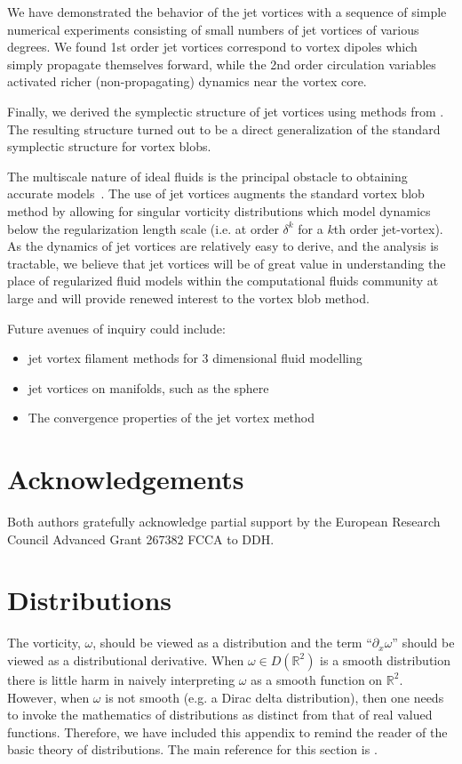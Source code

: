 \documentclass[12pt]{amsart}
\newcommand{\R}{\ensuremath{\mathbb{R}}}
\theoremstyle{remark}
\begin{document}
We have demonstrated the behavior of the jet vortices with a sequence of simple numerical experiments consisting of small numbers of jet vortices of various degrees.
We found 1st order jet vortices correspond to vortex dipoles which simply propagate themselves forward, while the 2nd order circulation variables activated richer (non-propagating) dynamics near the vortex core.

Finally, we derived the symplectic structure of jet vortices using methods from  \cite{MarsdenWeinstein1983}.
The resulting structure turned out to be a direct generalization of the standard
symplectic structure for vortex blobs.

The multiscale nature of ideal fluids is the principal obstacle to obtaining accurate models~\cite[Ch. 3]{Chorin1994}.
The use of jet vortices augments the standard vortex blob method by allowing for singular vorticity distributions which model dynamics
below the regularization length scale (i.e. at order $\delta^k$ for a $k$th order jet-vortex).
As the dynamics of jet vortices are relatively easy to derive, and the analysis is tractable, we believe that 
jet vortices will be of great value in understanding the place of regularized fluid models within the computational fluids community at large
and will provide renewed interest to the vortex blob method.

Future avenues of inquiry could include:
\begin{itemize}
	\item jet vortex filament methods for $3$ dimensional fluid modelling
	\item jet vortices on manifolds, such as the sphere
	\item The convergence properties of the jet vortex method
\end{itemize}

\section{Acknowledgements}
Both authors gratefully acknowledge partial support by the European Research
Council Advanced Grant 267382 FCCA to DDH.

\appendix

\section{Distributions}
\label{sec:distributions}
The vorticity, $\omega$, should be viewed as a distribution
and the term ``$\partial_x \omega$'' should be viewed
as a distributional derivative.
When $\omega \in D(\R^2)$ is a smooth distribution there is little harm in naively interpreting $\omega$ as a smooth function on $\R^2$.
However, when $\omega$ is not smooth (e.g. a Dirac delta distribution),
then one needs to invoke the mathematics of distributions
as distinct from that of real valued functions.
Therefore, we have included this appendix to remind the reader of the basic theory of distributions.
The main reference for this section is \cite{Hormander2003}.
\end{document}

